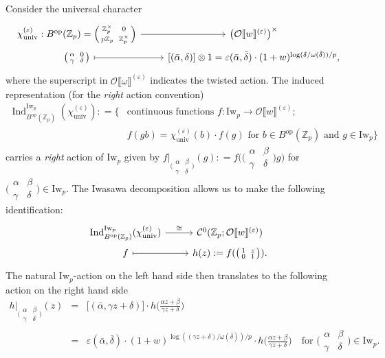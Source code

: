 \documentclass[12pt]{amsart}
\theoremstyle{definition}
\numberwithin{equation}{subsection}
\def\calC{\mathcal{C}}
\def\calO{\mathcal{O}}
\def\ZZ{\mathbb{Z}}
\newcommand{\op}{\mathrm{op}}
\newcommand{\Iw}{\mathrm{Iw}}
\newcommand{\univ}{\mathrm{univ}}
\DeclareMathOperator{\Ind}{Ind}
\newcommand{\Matrix}[4]{{\big(\begin{smallmatrix}#1&#2\\#3& #4\end{smallmatrix} \big)}}
\begin{document}
Consider the universal character
\[
\begin{tikzcd}[row sep = 0pt]
\chi^{(\varepsilon)}_\univ: B^\mathrm{op}(\ZZ_p) ={\Big( \begin{smallmatrix}
\ZZ_p^\times &0  \\p\ZZ_p & \ZZ_p^\times
\end{smallmatrix} \Big)} \ar[r]
&\big( \calO\llbracket w \rrbracket^{(\varepsilon)} \big) ^\times
\\
{\Matrix {\alpha}{0}{\gamma}{\delta}} \ar[r, mapsto] & {[(\bar \alpha, \delta)]} \otimes 1 = \varepsilon(\bar \alpha, \bar \delta) \cdot (1+w)^{\log(\delta/\omega( \bar \delta))/p},
\end{tikzcd}
\]
where the superscript in $\calO\llbracket \omega\rrbracket^{(\varepsilon)}$ indicates the twisted action. The induced representation (for the \emph{right} action convention)
\begin{align*}
\Ind_{B^\op(\ZZ_p)}^{\Iw_p}(\chi_\univ^{(\varepsilon)}): = \big\{ &\textrm{continuous functions }f: \Iw_p \to  \calO\llbracket w\rrbracket^{(\varepsilon)};
\\ & f(gb) = \chi_\univ^{(\varepsilon)}(b) \cdot f(g) \textrm{ for }b \in B^\op(\ZZ_p) \textrm{ and } g \in \Iw_p\big\}
\end{align*}
carries a \emph{right} action of $\Iw_p$ given by $f|_{\Matrix \alpha\beta{\gamma}\delta}(g): = f\big(\Matrix \alpha \beta \gamma \delta g\big)$ 
for $\Matrix \alpha\beta{\gamma}\delta \in \Iw_p$.
The Iwasawa decomposition allows us to make the following identification:
\[
\begin{tikzcd}[row sep =0pt]
\Ind_{B^\op(\ZZ_p)}^{\Iw_p}(\chi_\univ^{(\varepsilon)}) \ar[r, "\cong"]& \calC^0(\ZZ_p; \calO\llbracket w \rrbracket^{(\varepsilon)})
\\
f \ar[r, mapsto] & h(z): = f(\Matrix 1{z}01).
\end{tikzcd}
\] 
The natural $\Iw_p$-action on the left hand side then translates to the following action on the right hand side
\begin{eqnarray}
\label{E:induced representation action}
h\big|_{\Matrix \alpha\beta{\gamma}\delta}(z) & =& \big[(\bar \alpha, \gamma z+\delta)\big] \cdot h\Big( \frac{\alpha z+\beta}{\gamma z+\delta}\Big)
\\
\nonumber
&=& \varepsilon(\bar \alpha, \bar \delta) \cdot (1+w)^{\log\left((\gamma z+\delta )/ \omega(\bar \delta)\right) / p} \cdot h\Big( \frac{\alpha z+\beta}{\gamma z+\delta}\Big)
\quad \textrm{for } \Matrix \alpha\beta{\gamma}\delta \in \Iw_p.
\end{eqnarray}
\end{document}
